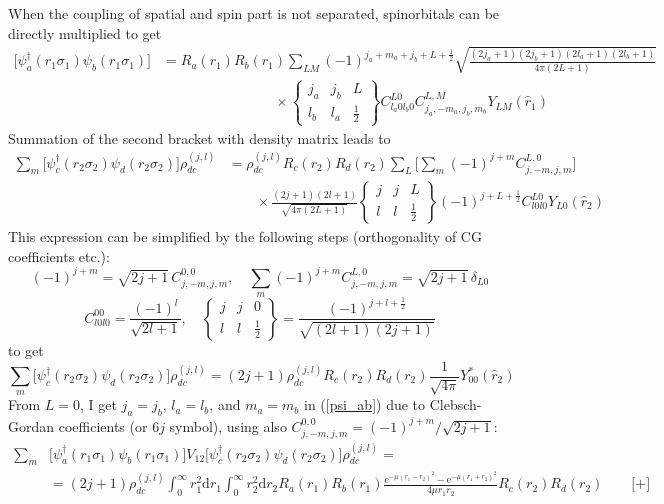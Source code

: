 \documentclass[10pt,a4paper]{article}
\begin{document}
When the coupling of spatial and spin part is not separated, spinorbitals can be directly multiplied to get
\begin{align}
\big[\psi_a^\dagger(r_1\sigma_1)\psi_b(r_1\sigma_1)\big] &=
R_a(r_1)R_b(r_1)\sum_{LM}(-1)^{j_a+m_a+j_b+L+\frac{1}{2}}
\sqrt{\frac{(2j_a+1)(2j_b+1)(2l_a+1)(2l_b+1)}{4\pi(2L+1)}} \nonumber\\
\label{psi_ab} &\qquad\qquad\qquad\qquad
\times\begin{Bmatrix} j_a & j_b & L \\ l_b & l_a & \frac{1}{2} \end{Bmatrix}
C_{l_a 0 l_b 0}^{L 0} C_{j_a,-m_a,j_b,m_b}^{L,M} Y_{LM}(\hat{r}_1)
\tag{V.~7.2.40}
\end{align}
Summation of the second bracket with density matrix leads to
\begin{align}
\sum_m\big[\psi_c^\dagger(r_2\sigma_2)\psi_d(r_2\sigma_2)\big]\rho_{dc}^{(j,l)} &=
\rho_{dc}^{(j,l)} R_c(r_2) R_d(r_2) \sum_L
\Big[\sum_m(-1)^{j+m}C_{j,-m,j,m}^{L,0}\Big] \nonumber\\
&\qquad\times\frac{(2j+1)(2l+1)}{\sqrt{4\pi(2L+1)}}
\begin{Bmatrix} j & j & L \\ l & l & \frac{1}{2} \end{Bmatrix}
(-1)^{j+L+\frac{1}{2}} C_{l 0 l 0}^{L 0} Y_{L0}(\hat{r}_2)
\end{align}
This expression can be simplified by the following steps (orthogonality of CG coefficients etc.):
\begin{equation}
(-1)^{j+m} = \sqrt{2j+1}\,C_{j,-m,j,m}^{0,0},\quad
\sum_m(-1)^{j+m}C_{j,-m,j,m}^{L,0} = \sqrt{2j+1}\,\delta_{L0}
\tag{V.~8.5.1, 8.7.2 or 4}
\end{equation}
\begin{equation}
C_{l0l0}^{00} = \frac{(-1)^l}{\sqrt{2l+1}},\quad
\begin{Bmatrix} j & j & 0 \\ l & l & \frac{1}{2} \end{Bmatrix} =
\frac{(-1)^{j+l+\frac{1}{2}}}{\sqrt{(2l+1)(2j+1)}}
\tag{V.~9.5.1}
\end{equation}
to get
\begin{equation}
\sum_m\big[\psi_c^\dagger(r_2\sigma_2)\psi_d(r_2\sigma_2)\big]\rho_{dc}^{(j,l)} =
(2j+1)\rho_{dc}^{(j,l)} R_c(r_2) R_d(r_2) \frac{1}{\sqrt{4\pi}}Y_{00}^*(\hat{r}_2)
\end{equation}
From $L=0$, I get $j_a=j_b$, $l_a=l_b$, and $m_a=m_b$ in (\ref{psi_ab}) due to Clebsch-Gordan coefficients (or $6j$ symbol), using also $C_{j,-m,j,m}^{0,0} = (-1)^{j+m}/\sqrt{2j+1}$:
\begin{align}
\sum_m &\big[\psi_a^\dagger(r_1\sigma_1)\psi_b(r_1\sigma_1)\big]V_{12}
\big[\psi_c^\dagger(r_2\sigma_2)\psi_d(r_2\sigma_2)\big]\rho_{dc}^{(j,l)} =\nonumber\\
\label{HFterm1}
&= (2j+1)\rho_{dc}^{(j,l)} \int_0^\infty r_1^2\mathrm{d}r_1
\int_0^\infty r_2^2\mathrm{d}r_2 R_a(r_1) R_b(r_1)
\frac{\mathrm{e}^{-\mu(r_1-r_2)^2}-\mathrm{e}^{-\mu(r_1+r_2)^2}}{4\mu r_1 r_2}
R_c(r_2) R_d(r_2) \qquad \textbf{[+]}
\end{align}
\end{document}
